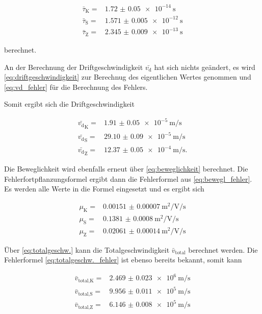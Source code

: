 \begin{align}
    \bar{\tau}_\text{K} =& \SI{1.72(5)e-14}{\second} \\
    \bar{\tau}_\text{S} =& \SI{1.571(5)e-12}{\second} \\
    \bar{\tau}_\text{Z} =& \SI{2.345(9)e-13}{\second}
    \label{eq:tau2_werte}
\end{align}

berechnet.

An der Berechnung der Driftgeschwindigkeit $\bar{v_\text{d}}$ hat sich nichts geändert, es wird \autoref{eq:driftgeschwindigkeit} zur Berechnug des eigentlichen Wertes genommen und \autoref{eq:vd_fehler} für die Berechnung des Fehlers.

Somit ergibt sich die Driftgeschwindigkeit

\begin{align}
    \bar{v_\text{d}}_\text{K} =& \SI{1.91(5)e-5}{\meter\per\second} \\
    \bar{v_\text{d}}_\text{S} =& \SI{29.10(9)e-5}{\meter\per\second} \\
    \bar{v_\text{d}}_\text{Z} =& \SI{12.37(5)e-4}{\meter\per\second}.
    \label{eq:vd2}
\end{align}

Die Beweglichkeit wird ebenfalls erneut über \autoref{eq:beweglichkeit} berechnet.
Die Fehlerfortpflanzungsformel ergibt dann die Fehlerformel aus \autoref{eq:bewegl_fehler}.
Es werden alle Werte in die Formel eingesetzt und es ergibt sich 

\begin{align}
    \mu _\text{K} =& \SI{0.00151(7)}{\meter\squared\per\volt\per\second}\\
    \mu _\text{S} =& \SI{0.1381(8)}{\meter\squared\per\volt\per\second}\\
    \mu _\text{Z} =& \SI{0.02061(14)}{\meter\squared\per\volt\per\second}
    \label{eq:mue2}
\end{align}

Über \autoref{eq:totalgeschw.} kann die Totalgeschwindigkeit $\bar{v}_\text{total}$ berechnet werden.
Die Fehlerformel \autoref{eq:totalgeschw._fehler} ist ebenso bereits bekannt, somit kann 

\begin{align}
    \bar{v}_\text{total,K} =& \SI{2.469(23)e6}{\meter\per\second}\\
    \bar{v}_\text{total,S} =& \SI{9.956(11)e5}{\meter\per\second}\\
    \bar{v}_\text{total,Z} =& \SI{6.146(8)e5}{\meter\per\second}
    \label{eq:vtotal2}
\end{align}

